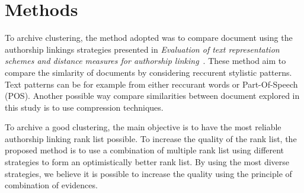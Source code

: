 \section{Methods \label{sec:methods}}

To archive clustering, the method adopted was to compare document using the authorship linkings strategies presented in \textit{Evaluation of text representation schemes and distance measures for authorship linking}~\cite{kocher_verification}.
These method aim to compare the simlarity of documents by considering reccurent stylistic patterns.
Text patterns can be for example from either reccurant words or Part-Of-Speech (POS).
Another possible way compare similarities between document explored in this study is to use compression techniques.

To archive a good clustering, the main objective is to have the most reliable authorship linking rank list possible.
To increase the quality of the rank list, the proposed method is to use a combination of multiple rank list using different strategies to form an optimistically better rank list.
By using the most diverse strategies, we believe it is possible to increase the quality using the principle of combination of evidences.








